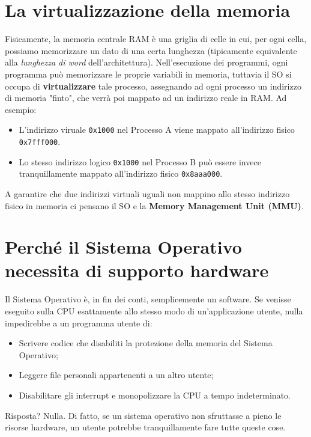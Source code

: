 \documentclass[12pt]{report}
\begin{document}
	\section{La virtualizzazione della memoria}
	Fisicamente, la memoria centrale RAM è una griglia di celle in cui, per ogni cella, possiamo memorizzare un dato di una certa lunghezza (tipicamente equivalente alla \textit{lunghezza di word} dell'architettura).
	Nell'esecuzione dei programmi, ogni programma può memorizzare le proprie variabili in memoria, tuttavia il SO si occupa di \textbf{virtualizzare} tale processo, assegnando ad ogni processo un indirizzo di memoria "finto", che verrà poi mappato ad un indirizzo reale in RAM.
	Ad esempio:
	\begin{itemize}
		\item L'indirizzo viruale \texttt{0x1000} nel Processo A viene mappato all'indirizzo fisico \texttt{0x7fff000}.
		
		\item Lo stesso indirizzo logico \texttt{0x1000} nel Processo B può essere invece tranquillamente mappato all'indirizzo fisico \texttt{0x8aaa000}.
	\end{itemize}
	A garantire che due indirizzi virtuali uguali non mappino allo stesso indirizzo fisico in memoria ci pensano il SO e la \textbf{Memory Management Unit (MMU)}.
	
	\section{Perché il Sistema Operativo necessita di supporto hardware}
	
	Il Sistema Operativo è, in fin dei conti, semplicemente un software. Se venisse eseguito sulla CPU esattamente allo stesso modo di un'applicazione utente, nulla impedirebbe a un programma utente di:
	
	\begin{itemize}
		\item Scrivere codice che disabiliti la protezione della memoria del Sistema Operativo;
		
		\item Leggere file personali appartenenti a un altro utente;
		
		\item Disabilitare gli interrupt e monopolizzare la CPU a tempo indeterminato.
	\end{itemize}
	Risposta? Nulla. Di fatto, se un sistema operativo non sfruttasse a pieno le risorse hardware, un utente potrebbe tranquillamente fare tutte queste cose.
	
\end{document}
